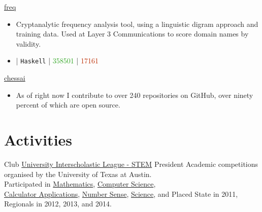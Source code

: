 \documentclass[10pt,letterpaper,sans]{moderncv}
\newcommand{\ghCommit}[1]{%
\begin{tikzpicture}[y=0.7pt,x=0.7pt,yscale=-1, inner sep=0pt, outer sep=0pt]%
  \path[even odd rule,fill=#1]%
  (10.86,7.00) .. controls (10.41,5.28) and%
  (8.86,4.00) .. (7.00,4.00) .. controls (5.14,4.00) and%
  (3.59,5.28) .. (3.14,7.00) -- (0.00,7.00) -- (0.00,9.00) --%
  (3.14,9.00) .. controls (3.59,10.72) and (5.14,12.00) ..%
  (7.00,12.00) .. controls (8.86,12.00) and (10.41,10.72) ..%
  (10.86,9.00) -- (14.00,9.00) -- (14.00,7.00) -- (10.86,7.00)%
  -- cycle(7.00,10.20) .. controls (5.78,10.20) and (4.80,9.22) ..%
  (4.80,8.00) .. controls (4.80,6.78) and (5.78,5.80) ..%
  (7.00,5.80) .. controls (8.22,5.80) and (9.20,6.78) ..%
  (9.20,8.00) .. controls (9.20,9.22) and (8.22,10.20) ..%
  (7.00,10.20) -- cycle;%
\end{tikzpicture}}
\newcommand{\wlink}[2]{\textcolor[HTML]{461645}{\href{#1}{#2}}}
\newcommand{\ghlink}[2]{\wlink{https://github.com/#1}{#2}}
\newcommand{\ghrepo}[1]{\ghlink{#1}{\faGithub}}
\newcommand{\ghlang}[1]{\texttt{#1}}
\newcommand{\ghcom}[1]{\textcolor[HTML]{666666}{\ghCommit{} #1}}
\newcommand{\ghadd}[1]{\textcolor[HTML]{30A622}{{\faPlusCircle} #1}}
\newcommand{\ghrem}[1]{\textcolor[HTML]{BD2C00}{{\faMinusCircle} #1}}
\newcommand{\ghtr}[0]{}
\newcommand{\ghub}[4]{\ghrepo{#2} | \ghlang{#1} | \ghadd{#3} | \ghrem{#4}}
\newcommand{\ghtable}[6]{#1 & #2 & #3 & #4 & #5 & #6 \\}
\newcommand{\ght}[9]{%
  \ghtable{#1}
          {\ghlink{#2/#3}{#3}}
          {\ghlang{#4}}
          {\ghcom{#5}}
          {\ghadd{#6}}
          {\ghrem{#7}}%
}
\begin{document}
\cventry{}
        {\wlink{https://github.com/chessai/freq}{freq}}
        {}{}{}
        {
\begin{itemize}
\item Cryptanalytic frequency analysis tool, using a linguistic digram approach and training data. Used at Layer 3 Communications to score domain names by validity.
\item \ghub{Haskell}{chessai/freq}{358501}{17161}
\end{itemize}
}

\cventry{}
        {\wlink{https://github.com/chessai}{chessai}}
        {}{}{}
        {
\begin{itemize}
\item As of right now I contribute to over 240 repositories on GitHub, over ninety percent of which are open source.
\end{itemize}
}


\section{Activities}
        {Club}
        {\wlink{http://www.uiltexas.org/academics/stem}{University Interscholastic League - STEM}}
        {President}{}{
        Academic competitions organised by the University of Texas at Austin. \\ %
        Participated in %
        \wlink{http://www.uiltexas.org/academics/stem/mathematics}{Mathematics}, %
        \wlink{http://www.uiltexas.org/academics/stem/computer-science}{Computer Science}, \\ %
        \wlink{http://www.uiltexas.org/academics/stem/calculator-applications}{Calculator Applications}, %
        \wlink{http://www.uiltexas.org/academics/stem/number-sense}{Number Sense}, %
        \wlink{http://www.uiltexas.org/academics/stem/science}{Science}, and %
        Placed State in 2011, Regionals in 2012, 2013, and 2014.
}          
\end{document}
